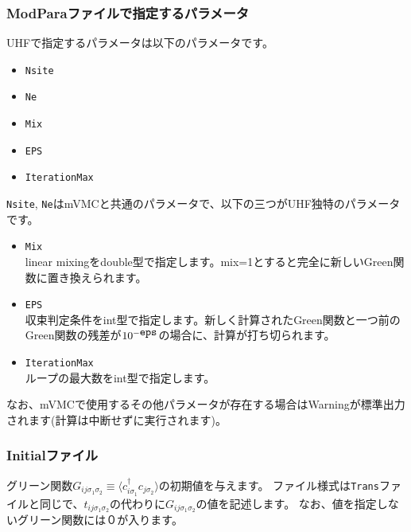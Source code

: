 \subsubsection{ModParaファイルで指定するパラメータ}
UHFで指定するパラメータは以下のパラメータです。
\begin{itemize}
\item{\verb|Nsite|}
\item{\verb|Ne|}
\item{\verb|Mix|}
\item{\verb|EPS|}
\item{\verb|IterationMax|}
\end{itemize}
\verb|Nsite|, \verb|Ne|はmVMCと共通のパラメータで、以下の三つがUHF独特のパラメータです。
\begin{itemize}
\item{\verb|Mix|}\\
linear mixingをdouble型で指定します。mix=1とすると完全に新しいGreen関数に置き換えられます。
\item{\verb|EPS|}\\
収束判定条件をint型で指定します。新しく計算されたGreen関数と一つ前のGreen関数の残差が$10^{-\verb|eps|}$の場合に、計算が打ち切られます。
\item{\verb|IterationMax|}\\
ループの最大数をint型で指定します。
\end{itemize}
なお、mVMCで使用するその他パラメータが存在する場合はWarningが標準出力されます(計算は中断せずに実行されます)。

\subsubsection{Initialファイル}
グリーン関数$G_{ij\sigma_1\sigma_2}\equiv \langle c_{i\sigma_1}^\dag c_{j\sigma_2}\rangle$の初期値を与えます。
ファイル様式は\verb|Trans|ファイルと同じで、$t_{ij\sigma_1\sigma_2}$の代わりに$G_{ij\sigma_1\sigma_2}$の値を記述します。
なお、値を指定しないグリーン関数には０が入ります。

